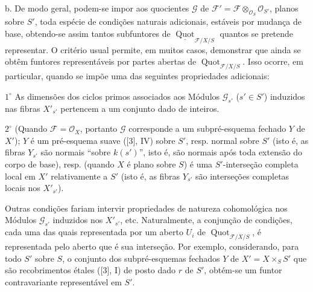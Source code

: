 \medskip
\noindent b. De modo geral, podem-se impor aos quocientes $\mathcal G$ de
$\mathcal F'=\mathcal F\otimes_{\mathcal O_S}\mathcal O_{S'}$, planos sobre
$S'$, toda espécie de condições naturais adicionais, estáveis por mudança de
base, obtendo-se assim tantos subfuntores de
$\underline{\operatorname{Quot}}_{\mathcal F/X/S}$ quantos se pretende
representar. O critério usual permite, em muitos casos, demonstrar que ainda se
obtêm funtores representáveis por partes abertas de
$\operatorname{Quot}_{\mathcal F/X/S}$. Isso ocorre, em particular, quando se
impõe uma das seguintes propriedades adicionais:

\smallskip
\noindent $1^\circ$ As dimensões dos ciclos primos associados aos Módulos
$\mathcal G_{s'}$ ($s'\in S'$) induzidos nas fibras $X'_{s'}$ pertencem a um
conjunto dado de inteiros.

\smallskip
\noindent $2^\circ$ (Quando $\mathcal F=\mathcal O_X$, portanto $\mathcal G$
corresponde a um subpré-esquema fechado $Y$ de $X'$); $Y$ é um pré-esquema
suave ([3], IV) sobre $S'$, resp. normal sobre $S'$ (isto é, as fibras $Y_{s'}$
são normais ``sobre $k(s')$'', isto é, são normais após toda extensão do corpo
de base), resp. (quando $X$ é plano sobre $S$) é uma $S'$-interseção completa
local em $X'$ relativamente a $S'$ (isto é, as fibras $Y_{s'}$ são interseções
completas locais nos $X'_{s'}$).

Outras condições fariam intervir propriedades de natureza cohomológica nos
Módulos $\mathcal G_{s'}$ induzidos nos $X'_{s'}$, etc. Naturalmente, a
conjunção de condições, cada uma das quais representada por um aberto $U_i$ de
$\operatorname{Quot}_{\mathcal F/X/S}$, é representada pelo aberto que é sua
interseção. Por exemplo, considerando, para todo $S'$ sobre $S$, o conjunto dos
subpré-esquemas fechados $Y$ de $X'=X\times_SS'$ que são recobrimentos étales
([3], I) de posto dado $r$ de $S'$, obtém-se um funtor contravariante
representável em $S'$.

